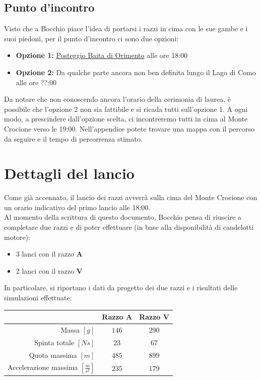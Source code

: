 \documentclass[12pt, a4paper]{article}
\begin{document}
\subsection*{Punto d'incontro}
Visto che a Bocchio piace l'idea di portarsi i razzi in cima con le sue gambe e i suoi piedoni, per il punto d'incontro ci sono due opzioni:
\begin{itemize}
    \item \textbf{Opzione 1:} \href{https://goo.gl/maps/onBNzEBKfEbReJ7Q8}{Posteggio Baita di Orimento} alle ore 18:00
    \item \textbf{Opzione 2:} Da qualche parte ancora non ben definita lungo il Lago di Como alle ore ??:00
\end{itemize}
Da notare che non conoscendo ancora l'orario della cerimonia di laurea, è possibile che l'opzione 2 non sia fattibile e si ricada tutti sull'opzione 1.
A ogni modo, a prescindere dall'opzione scelta, ci incontreremo tutti in cima al Monte Crocione verso le 19:00.
Nell'appendice potete trovare una mappa con il percorso da seguire e il tempo di percorrenza stimato.


\section{Dettagli del lancio}

Come già accennato, il lancio dei razzi avverrà sulla cima del Monte Crocione con un orario indicativo del primo lancio alle 18:00.\\
Al momento della scrittura di questo documento, Bocchio pensa di riuscire a completare due razzi e di poter effettuare (in base alla disponibilità di candelotti motore):
\begin{itemize}
    \item 3 lanci con il razzo \textbf{A}
    \item 2 lanci con il razzo \textbf{V}
\end{itemize}
In particolare, si riportano i dati da progetto dei due razzi e i risultati delle simulazioni effettuate:
\begin{table}[h]
    \centering
    \begin{tabular}{|r|c|c|} \hline
        ~                                       & \textbf{Razzo A} & \textbf{Razzo V} \\ \hline
        Massa $[g]$                             & $146$            & $290$            \\ \hline
        Spinta totale $[Ns]$                    & $23$             & $67$             \\ \hline
        Quota massima $[m]$                     & $485$            & $899$            \\ \hline
        Accelerazione massima $[\frac{m}{s^2}]$ & $235$            & $179$            \\ \hline
    \end{tabular}
    \label{tab:obiettivi}
\end{table}
\end{document}
